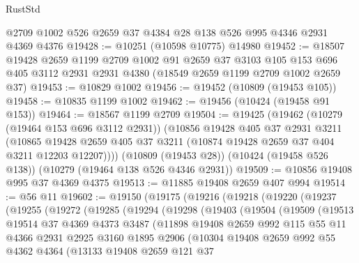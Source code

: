 \begin{lexlean}{RustStd}
\begin{coremodule}
    @2709
    @1002
    @526
    @2659
    @37
    @4384
    @28
    @138
    @526
    @995
    @4346
    @2931
    @4369
    @4376
@19428 := @10251 (@10598 @10775) @14980
@19452 := @18507
    @19428
    @2659
    @1199
    @2709
    @1002
    @91
    @2659
    @37
    @3103
    @105
    @153
    @696
    @405
    @3112
    @2931
    @2931
    @4380
    (@18549 @2659 @1199 @2709 @1002 @2659 @37)
@19453 := @10829 @1002
@19456 := @19452 (@10809 (@19453 @105))
@19458 := @10835 @1199 @1002
@19462 := @19456 (@10424 (@19458 @91 @153))
@19464 := @18567 @1199 @2709
@19504 := @19425
    (@19462
      (@10279 (@19464 @153 @696 @3112 @2931))
      (@10856
        @19428
        @405
        @37
        @2931
        @3211
        (@10865 @19428 @2659 @405 @37 @3211 (@10874 @19428 @2659 @37 @404 @3211 @12203 @12207))))
    (@10809 (@19453 @28))
    (@10424 (@19458 @526 @138))
    (@10279 (@19464 @138 @526 @4346 @2931))
@19509 := @10856 @19408 @995 @37 @4369 @4375
@19513 := @11885 @19408 @2659 @407 @994
@19514 := @56 @11
@19602 := @19150
    (@19175
      (@19216
        (@19218
          (@19220
            (@19237
              (@19255
                (@19272
                  (@19285
                    (@19294
                      (@19298
                        (@19403
                          (@19504
                            (@19509
                              (@19513
                                @19514
                                @37
                                @4369
                                @4373
                                @3487
                                (@11898
                                  @19408
                                  @2659
                                  @992
                                  @115
                                  @55
                                  @11
                                  @4366
                                  @2931
                                  @2925
                                  @3160
                                  @1895
                                  @2906
                                  (@10304
                                    @19408
                                    @2659
                                    @992
                                    @55
                                    @4362
                                    @4364
                                    (@13133
                                      @19408
                                      @2659
                                      @121
                                      @37

\end{coremodule}
\end{lexlean}
